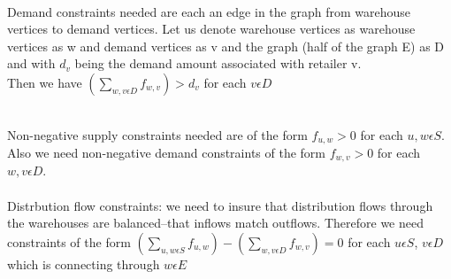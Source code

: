 \documentclass[12pt]{report}
\begin{document}
\\
Demand constraints needed are each an edge in the graph from warehouse vertices to demand vertices.  Let us denote warehouse vertices as
warehouse vertices as w and demand vertices as v and the graph (half of the graph E) as D and with $d_v$ being the demand amount associated with retailer v.\\
Then we have $(\sum\limits_{w,v\epsilon D} f_{w,v})>d_v$ for each $v \epsilon D$

\\
Non-negative supply constraints needed are of the form $f_{u,w}>0$ for each $u,w \epsilon S$.\\
Also we need non-negative demand constraints of the form  $f_{w,v}>0$ for each $w,v \epsilon D$.\\

\\Distrbution flow constraints:  we need to insure that distribution flows through the warehouses are balanced--that inflows 
match outflows.  Therefore we need constraints
of the form $(\sum\limits_{u,w\epsilon S} f_{u,w}) - (\sum\limits_{w,v\epsilon D} f_{w,v}) = 0$ for each $u \epsilon S$, 
$v \epsilon D$ which is connecting through $w \epsilon E$
\end{document}
